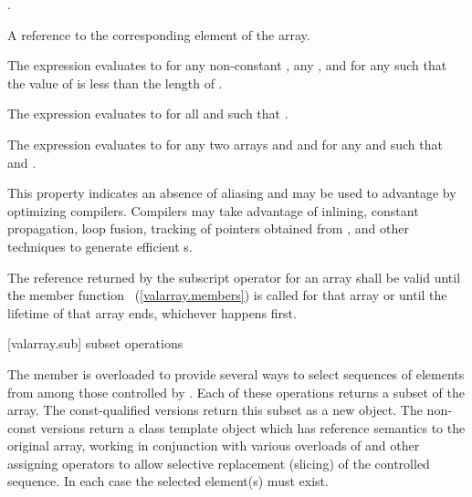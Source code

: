 \begin{itemdescr}
\pnum
\requires
{}.

\pnum
\returns
A reference to the corresponding element of the array.
\begin{note}
The expression 
evaluates to  for any non-constant ,
any , and for any 
such that the value of  is less than the length of .
\end{note}

\pnum
\remarks
The expression 
evaluates to  for all  and 
such that .

\pnum
The expression 
evaluates to  for any two arrays
 and  and for any
 and 
such that 
and .
\begin{note} This property indicates an absence of aliasing and may be used to
advantage by optimizing compilers. Compilers may take advantage
of inlining, constant propagation, loop fusion,
tracking of pointers obtained from
,
and other techniques to generate efficient
s.
\end{note}

\pnum
The reference returned by the subscript operator for an array shall
be valid until the member function
~(\ref{valarray.members}) is called for that array or until the lifetime of
that array ends, whichever happens first.
\end{itemdescr}

[valarray.sub]{ subset operations}

%
\pnum
The member  is overloaded to provide several ways to select
sequences of elements from among those controlled by . Each of these
operations returns a subset of the array. The const-qualified versions return this
subset as a new  object. The non-const versions return a class
template object which has reference semantics to the original array, working in
conjunction with various overloads of  and other assigning
operators to allow selective replacement (slicing) of the controlled sequence.
In each case the selected element(s) must exist.

